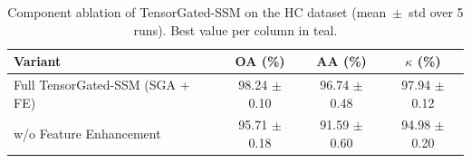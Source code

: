 \begin{table}[htbp]
  \centering
  \caption{Component ablation of TensorGated-SSM on the HC dataset (mean~$\pm$~std over 5 runs). Best value per column in \textcolor{tgteal}{teal}.}
  \label{tab:ablation_hc}
  \begin{tabular}{l c c c}
    \toprule
    Variant & OA (\%) & AA (\%) & $\kappa$ (\%) \\
    \midrule
    Full TensorGated-SSM (SGA + FE) & \textcolor{tgteal}{98.24 $\pm$ 0.10} & \textcolor{tgteal}{96.74 $\pm$ 0.48} & \textcolor{tgteal}{97.94 $\pm$ 0.12} \\
    w/o Feature Enhancement & 95.71 $\pm$ 0.18 & 91.59 $\pm$ 0.60 & 94.98 $\pm$ 0.20 \\
    \bottomrule
  \end{tabular}
\end{table}
